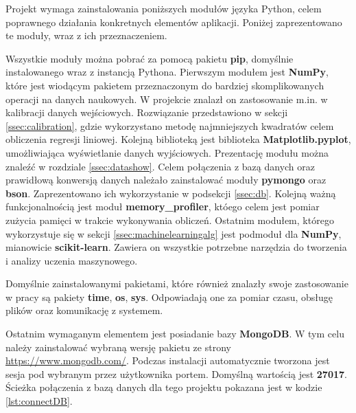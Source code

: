 Projekt wymaga zainstalowania poniższych modułów języka Python, celem poprawnego działania konkretnych elementów aplikacji. Poniżej zaprezentowano te moduły, wraz z ich przeznaczeniem.\par
Wszystkie moduły można pobrać za pomocą pakietu \textbf{pip}, domyślnie instalowanego wraz z instancją Pythona. Pierwszym modułem jest \textbf{NumPy}, które jest wiodącym pakietem przeznaczonym do bardziej skomplikowanych operacji na danych naukowych. W projekcie znalazł on zastosowanie m.in. w kalibracji danych wejściowych. Rozwiązanie przedstawiono w sekcji \ref{ssec:calibration}, gdzie wykorzystano metodę najmniejszych kwadratów celem obliczenia regresji liniowej. Kolejną biblioteką jest biblioteka \textbf{Matplotlib.pyplot}, umożliwiająca wyświetlanie danych wyjściowych. Prezentację modułu można znaleźć w rozdziale \ref{ssec:datashow}. Celem połączenia z bazą danych oraz prawidłową konwersją danych należało zainstalować moduły \textbf{pymongo} oraz \textbf{bson}. Zaprezentowano ich wykorzystanie w podsekcji \ref{ssec:db}. Kolejną ważną funkcjonalnością jest moduł \textbf{memory\_profiler}, któego celem jest pomiar zużycia pamięci w trakcie wykonywania obliczeń. Ostatnim modułem, którego wykorzystuje się w sekcji \ref{ssec:machinelearningalg} jest podmoduł dla \textbf{NumPy}, mianowicie \textbf{scikit-learn}. Zawiera on wszystkie potrzebne narzędzia do tworzenia i analizy uczenia maszynowego.\par
Domyślnie zainstalowanymi pakietami, które również znalazły swoje zastosowanie w pracy są pakiety \textbf{time}, \textbf{os}, \textbf{sys}. Odpowiadają one za pomiar czasu, obsługę plików oraz komunikację z systemem.\par
Ostatnim wymaganym elementem jest posiadanie bazy \textbf{MongoDB}. W tym celu należy zainstalować wybraną wersję pakietu ze strony \url{https://www.mongodb.com/}. Podczas instalacji automatycznie tworzona jest sesja pod wybranym przez użytkownika portem. Domyślną wartością jest \textbf{27017}. Ścieżka połączenia z bazą danych dla tego projektu pokazana jest w kodzie \ref{lst:connectDB}.
